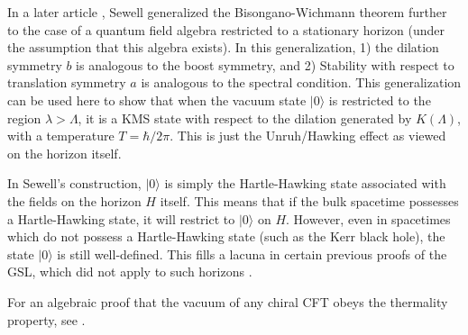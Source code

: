 \documentclass[12pt]{article}
\begin{document}
In a later article \cite{sewell82}, Sewell generalized the Bisongano-Wichmann theorem further to the case of a quantum field algebra restricted to a stationary horizon (under the assumption that this algebra exists).  In this generalization, 1) the dilation symmetry $b$ is analogous to the boost symmetry, and 2) Stability with respect to translation symmetry $a$ is analogous to the spectral condition.  This generalization can be used here to show that when the vacuum state $|0\rangle$ is restricted to the region $\lambda > \Lambda$, it is a KMS state with respect to the dilation generated by $K(\Lambda)$, with a temperature $T = \hbar / 2\pi$.  This is just the Unruh/Hawking effect as viewed on the horizon itself.

In Sewell's construction, $|0\rangle$ is simply the Hartle-Hawking state associated with the fields on the horizon $H$ itself.  This means that if the bulk spacetime possesses a Hartle-Hawking state, it will restrict to $|0\rangle$ on $H$.  However, even in spacetimes which do not possess a Hartle-Hawking state (such as the Kerr black hole), the state $|0\rangle$ is still well-defined.  This fills a lacuna in certain previous proofs of the GSL, which did not apply to such horizons \cite{10proofs}.

For an algebraic proof that the vacuum of any chiral CFT obeys the thermality property, see \cite{gabbiani1993}.

\end{document}
